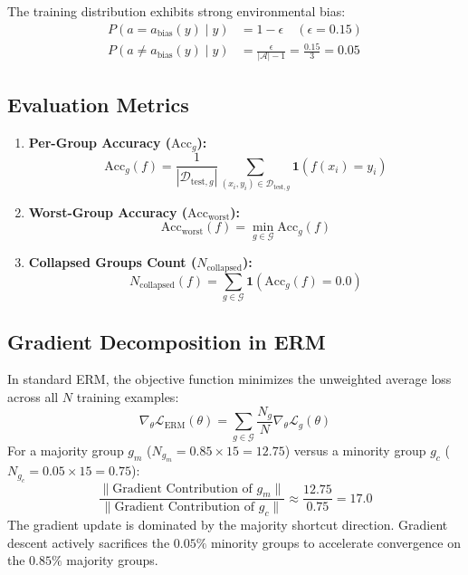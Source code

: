 \documentclass[10pt,journal,compsoc]{IEEEtran}
\begin{document}
The training distribution exhibits strong environmental bias:
\begin{align}
P(a = a_{\text{bias}}(y) \mid y) &= 1 - \epsilon \quad (\epsilon = 0.15) \\
P(a \neq a_{\text{bias}}(y) \mid y) &= \frac{\epsilon}{|\mathcal{A}| - 1} = \frac{0.15}{3} = 0.05
\end{align}

\subsection{Evaluation Metrics}
\begin{enumerate}
\item \textbf{Per-Group Accuracy ($\text{Acc}_g$):}
\begin{equation}
\text{Acc}_g(f) = \frac{1}{|\mathcal{D}_{\text{test}, g}|} \sum_{(x_i, y_i) \in \mathcal{D}_{\text{test}, g}} \mathbf{1}(f(x_i) = y_i)
\end{equation}
\item \textbf{Worst-Group Accuracy ($\text{Acc}_{\text{worst}}$):}
\begin{equation}
\text{Acc}_{\text{worst}}(f) = \min_{g \in \mathcal{G}} \text{Acc}_g(f)
\end{equation}
\item \textbf{Collapsed Groups Count ($N_{\text{collapsed}}$):}
\begin{equation}
N_{\text{collapsed}}(f) = \sum_{g \in \mathcal{G}} \mathbf{1}(\text{Acc}_g(f) = 0.0)
\end{equation}
\end{enumerate}

\subsection{Gradient Decomposition in ERM}
In standard ERM, the objective function minimizes the unweighted average loss across all $N$ training examples:
\begin{equation}
\nabla_\theta \mathcal{L}_{\text{ERM}}(\theta) = \sum_{g \in \mathcal{G}} \frac{N_g}{N} \nabla_\theta \mathcal{L}_g(\theta)
\end{equation}
For a majority group $g_m$ ($N_{g_m} = 0.85 \times 15 = 12.75$) versus a minority group $g_c$ ($N_{g_c} = 0.05 \times 15 = 0.75$):
\begin{equation}
\frac{\|\text{Gradient Contribution of } g_m\|}{\|\text{Gradient Contribution of } g_c\|} \approx \frac{12.75}{0.75} = \mathbf{17.0}
\end{equation}
The gradient update is dominated by the majority shortcut direction. Gradient descent actively sacrifices the $0.05\%$ minority groups to accelerate convergence on the $0.85\%$ majority groups.
\end{document}
